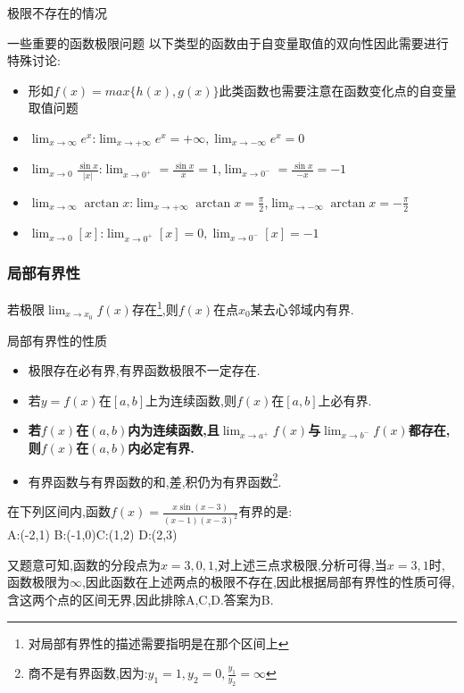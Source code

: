 \documentclass[12pt, a4paper, oneside, UTF8]{ctexbook}
\begin{document}
\begin{sloppypar}
\begin{criterion}{极限不存在的情况}{}
    \end{criterion}
    \begin{criterion}{一些重要的函数极限问题}{}
        以下类型的函数由于自变量取值的双向性因此需要进行特殊讨论:
        \begin{itemize}
            \item 形如$f(x)=max\{h(x),g(x)\}$此类函数也需要注意在函数变化点的自变量取值问题
            \item $\lim_{x \to \infty}e^x$:$\lim _{x \to +\infty}e^x=+\infty,
                      \lim _{x \to -\infty}e^x=0$
            \item $\lim_{x \to 0} \frac{\sin x}{|x|}$:$\lim_{x \to 0^+}=\frac{\sin x}{x}=1$,$\lim_{x \to 0^-}=\frac{\sin x}{-x}=-1$
            \item $\lim_{x \to \infty }\arctan x$:$\lim_{x \to +\infty}\arctan x=\frac{\pi}{2}$,$\lim_{x \to -\infty}\arctan x= -\frac{\pi}{2}$
            \item $\lim_{x \to 0}[x]$:$\lim _{x \to 0^+}[x]=0,\lim_{x \to 0^-}[x]=-1$
        \end{itemize}
    \end{criterion}
    \subsubsection{局部有界性}
    \begin{them}{}{}
        若极限$\lim_{x \to x_0}f(x)$存在\footnote{对局部有界性的描述需要指明是在那个区间上},则$f(x)$在点$x_0$某去心邻域内有界.
    \end{them}
    \begin{criterion}{局部有界性的性质}{}
        \begin{itemize}
            \item 极限存在必有界,有界函数极限不一定存在.
            \item 若$y=f(x)$在$[a,b]$上为连续函数,则$f(x)$在$[a,b]$上必有界.
            \item \textbf{若$f(x)$在$(a,b)$内为连续函数,且$\lim_{x \to a^+}f(x)$与$\lim_{x\to b^-}f(x)$都存在,则$f(x)$在$(a,b)$内必定有界.}
            \item 有界函数与有界函数的和,差,积仍为有界函数\footnote{商不是有界函数,因为:$y_1=1,y_2=0,\frac{y_1}{y_2}=\infty$}.
        \end{itemize}
    \end{criterion}
    \begin{problem}
    在下列区间内,函数$f(x)={\frac{x\sin(x-3)}{(x-1)(x-3)^{2}}}$有界的是:\\
    A:(-2,1) \qquad  B:(-1,0)\qquad C:(1,2) \qquad D:(2,3)
    \end{problem}
    \begin{solution}
        又题意可知,函数的分段点为$x=3,0,1$,对上述三点求极限,分析可得,当$x=3,1$时,函数极限为$\infty$,因此函数在上述两点的极限不存在,因此根据局部有界性的性质可得,含这两个点的区间无界,因此排除A,C,D.答案为B.
    \end{solution}

\end{sloppypar}
\end{document}
